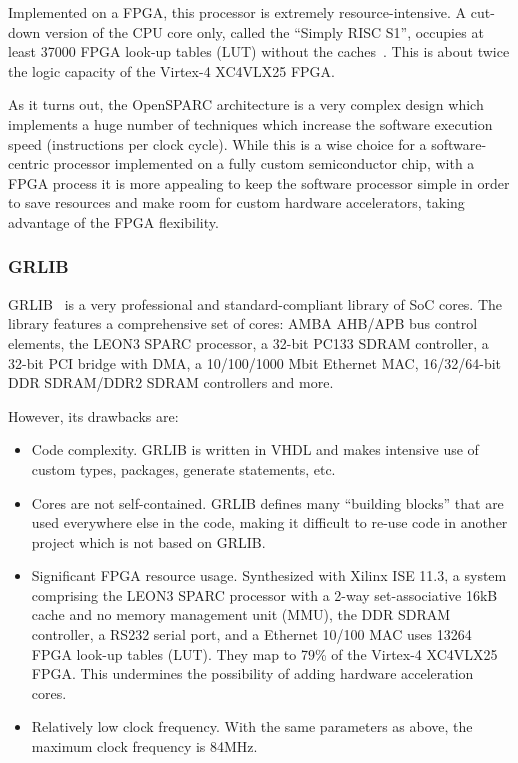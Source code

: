 \documentclass[a4paper,11pt]{kthesis}
\begin{document}
Implemented on a FPGA, this processor is extremely resource-intensive. A cut-down version of the CPU core only, called the ``Simply RISC S1'', occupies at least 37000 FPGA look-up tables (LUT) without the caches~\cite{simplyrisc}. This is about twice the logic capacity of the Virtex-4 XC4VLX25 FPGA.

As it turns out, the OpenSPARC architecture is a very complex design which implements a huge number of techniques which increase the software execution speed (instructions per clock cycle). While this is a wise choice for a software-centric processor implemented on a fully custom semiconductor chip, with a FPGA process it is more appealing to keep the software processor simple in order to save resources and make room for custom hardware accelerators, taking advantage of the FPGA flexibility.

\subsubsection{GRLIB}
GRLIB~\cite{grlib} is a very professional and standard-compliant library of SoC cores. The library features a comprehensive set of cores: AMBA AHB/APB bus control elements, the LEON3 SPARC processor, a 32-bit PC133 SDRAM controller, a 32-bit PCI bridge with DMA, a 10/100/1000 Mbit Ethernet MAC,  16/32/64-bit DDR SDRAM/DDR2 SDRAM controllers and more.

However, its drawbacks are:
\begin{itemize}
\item Code complexity. GRLIB is written in VHDL and makes intensive use of custom types, packages, generate statements, etc.
\item Cores are not self-contained. GRLIB defines many ``building blocks'' that are used everywhere else in the code, making it difficult to re-use code in another project which is not based on GRLIB.
\item Significant FPGA resource usage. Synthesized with Xilinx ISE 11.3, a system comprising the LEON3 SPARC processor with a 2-way set-associative 16kB cache and no memory management unit (MMU), the DDR SDRAM controller, a RS232 serial port, and a Ethernet 10/100 MAC uses 13264 FPGA look-up tables (LUT). They map to 79\% of the Virtex-4 XC4VLX25 FPGA. This undermines the possibility of adding hardware acceleration cores.
\item Relatively low clock frequency. With the same parameters as above, the maximum clock frequency is 84MHz.
\end{itemize}
\end{document}
